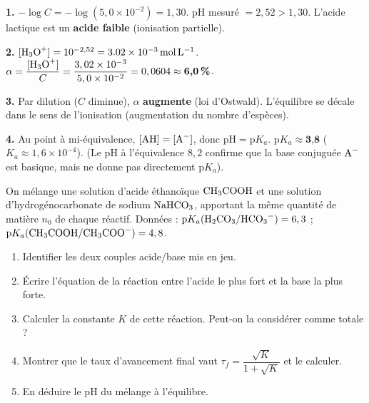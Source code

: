 \documentclass[11pt]{article}
\begin{document}
\begin{corrige}
\textbf{1.} $-\log C = -\log(5,0\times10^{-2}) = 1,30$. pH mesuré $= 2,52 > 1,30$. L'acide lactique est un \textbf{acide faible} (ionisation partielle).
\par\textbf{2.} $[\ce{H3O+}] = 10^{-2,52} = \SI{3,02e-3}{mol.L^{-1}}$. $\alpha = \dfrac{[\ce{H3O+}]}{C} = \dfrac{3,02\times10^{-3}}{5,0\times10^{-2}} = 0,0604 \approx \textbf{6,0\,\%}$.
\par\textbf{3.} Par dilution ($C$ diminue), $\alpha$ \textbf{augmente} (loi d'Ostwald). L'équilibre se décale dans le sens de l'ionisation (augmentation du nombre d'espèces).
\par\textbf{4.} Au point à mi-équivalence, $[\ce{AH}] = [\ce{A-}]$, donc $\mathrm{pH} = \mathrm{p}K_a$. $\mathrm{p}K_a \approx \textbf{3,8}$ ($K_a \approx 1,6\times10^{-4}$). (Le pH à l'équivalence $8,2$ confirme que la base conjuguée $\ce{A-}$ est basique, mais ne donne pas directement $\mathrm{p}K_a$).
\end{corrige}

\begin{exercice}
On mélange une solution d'acide éthanoïque $\ce{CH3COOH}$ et une solution d'hydrogénocarbonate de sodium $\ce{NaHCO3}$, apportant la même quantité de matière $n_0$ de chaque réactif. Données : $\mathrm{p}K_a(\ce{H2CO3}/\ce{HCO3-}) = 6,3$ ; $\mathrm{p}K_a(\ce{CH3COOH}/\ce{CH3COO-}) = 4,8$.
\begin{enumerate}
\item Identifier les deux couples acide/base mis en jeu.
\item Écrire l'équation de la réaction entre l'acide le plus fort et la base la plus forte.
\item Calculer la constante $K$ de cette réaction. Peut-on la considérer comme totale ?
\item Montrer que le taux d'avancement final vaut $\tau_f = \dfrac{\sqrt{K}}{1+\sqrt{K}}$ et le calculer.
\item En déduire le pH du mélange à l'équilibre.
\end{enumerate}
\end{exercice}
\end{document}
